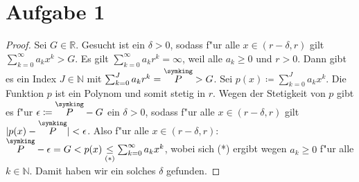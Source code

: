 \documentclass[a4paper, landscape,twocolumn,8pt]{scrartcl}
\newcommand{\crown}[1]{\overset{\symking}{#1}}
\theoremstyle{plain}
\begin{document}
\section*{Aufgabe 1}
\begin{proof}
Sei $G \in \mathbb R$. Gesucht ist ein $\delta>0$, sodass f"ur alle $x\in(r-\delta,r)$ gilt $\sum^{\infty}_{k=0}a_kx^k > G$.  Es gilt $\sum^{\infty}_{k=0}a_kr^k = \infty$, weil alle $a_k\geq0$ und $r>0$. Dann gibt es ein Index $J \in \mathbb N$ mit $\sum^{J}_{k=0}a_kr^k = \crown P > G$. Sei $p(x) \coloneqq \sum^{J}_{k=0}a_kx^k$. Die Funktion $p$ ist ein Polynom und somit stetig in $r$. Wegen der Stetigkeit von $p$ gibt es f"ur $\epsilon \coloneqq \crown P - G$ ein $\delta > 0$, sodass f"ur alle $x \in (r-\delta,r)$ gilt $|p(x)-\crown P| < \epsilon$. Also f"ur alle $x \in (r-\delta,r)$: $\crown P - \epsilon = G < p(x) \underset{(*)}{\leq} \sum^{\infty}_{k=0}a_kx^k$, wobei sich (*) ergibt wegen $a_k\geq 0$ f"ur alle $k \in \mathbb N$. Damit haben wir ein solches $\delta$ gefunden.
\end{proof}
\end{document}
